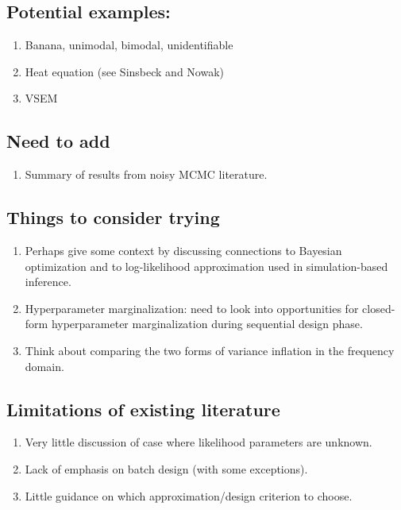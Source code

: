 \documentclass[12pt]{article}
\begin{document}
\subsection{Potential examples:}
\begin{enumerate}
\item Banana, unimodal, bimodal, unidentifiable
\item Heat equation (see Sinsbeck and Nowak) 
\item VSEM
\end{enumerate}

\subsection{Need to add}
\begin{enumerate}
\item Summary of results from noisy MCMC literature. 
\end{enumerate}

\subsection{Things to consider trying}
\begin{enumerate}
\item Perhaps give some context by discussing connections to Bayesian optimization and to log-likelihood approximation used in 
simulation-based inference. 
\item Hyperparameter marginalization: need to look into opportunities for closed-form hyperparameter marginalization during 
sequential design phase. 
\item Think about comparing the two forms of variance inflation in the frequency domain. 
\end{enumerate}

\subsection{Limitations of existing literature}
\begin{enumerate}
\item Very little discussion of case where likelihood parameters are unknown. 
\item Lack of emphasis on batch design (with some exceptions).
\item Little guidance on which approximation/design criterion to choose.
\end{enumerate}

 

\end{document}
